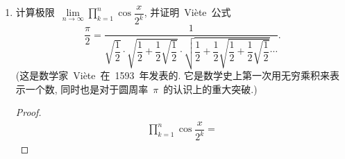 \documentclass[UTF8,a4paper,11pt,twoside]{book}
\begin{document}
\begin{enumerate}
	\item 计算极限~$\lim\limits_{n\to\infty} \displaystyle\prod\limits_{k=1}^n \cos{\dfrac{x}{2^k}}$, 并证明~Vi\`ete~公式
	      \[
		      \dfrac{\pi}{2}=\dfrac{1}{ \sqrt{\dfrac{1}{2}} \cdot \sqrt{\dfrac{1}{2}+\dfrac{1}{2}\sqrt{\dfrac{1}{2}}} \cdot \sqrt{\dfrac{1}{2}+\dfrac{1}{2}\sqrt{\dfrac{1}{2}+\dfrac{1}{2}\sqrt{\dfrac{1}{2}}}}\cdots}.
	      \]
		(这是数学家~Vi\`ete~在~1593~年发表的. 它是数学史上第一次用无穷乘积来表示一个数, 同时也是对于圆周率~$\pi$~的认识上的重大突破.)
		\begin{proof}
			\[
				\begin{split}
				\prod\limits_{k=1}^n \cos{\dfrac{x}{2^k}}=
				\end{split}
			\]
		\end{proof}
\end{enumerate}
\end{document}

